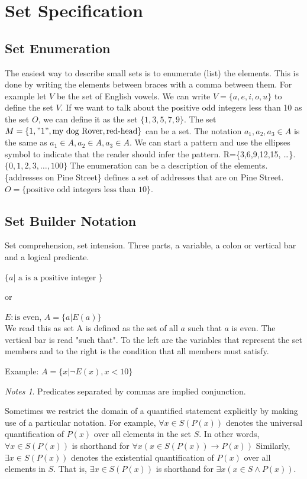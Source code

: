 \documentclass[11pt]{book} %
\theoremstyle {definition}
\theoremstyle {remark}
\newtheorem*{notes}{Notes}
\begin{document}
  \section{Set Specification}
    \subsection {Set Enumeration}
  The easiest way to describe small sets is to enumerate (list) the elements. This is done by writing the elements between braces with a comma between them. For example let $V$ be the set of English vowels. We can write $V=\{a,e,i,o,u\}$ to define the set $V$. If we want to talk about the positive odd integers less than 10 as the set $O$, we can define it as the set $\{1,3,5,7,9\}$. 
The set $M=\{1, "1", \text{my dog Rover}, \text{red-head}\}$ can be a set. The notation $a_1,a_2,a_3 \in A$ is the same as $a_1 \in A, a_2 \in A, a_3 \in A$. We can start a pattern and use the ellipses symbol to indicate that the reader should infer the pattern. R=\{3,6,9,12,15, \dots\}. $\{0,1,2,3, \dots ,100\}$ The enumeration can be a description of the elements. \{addresses on Pine Street\} defines a set of addresses that are on Pine Street. $O=\{ \text{positive odd integers less than 10} \}$. 


     \subsection {Set Builder Notation}
Set comprehension, set intension. Three parts, a variable, a colon or vertical bar and a logical predicate.  


$\{a | \text{  a is a positive integer }\} $

or 

$E: \text{is even}$, 
$A= \{a | E(a)\}$\\
We read this as 
set A is defined as the set of all $a$ such that $a$ is even. The vertical bar is read "such that". To the left are the variables that represent the set members and to the right is the condition that all members must satisfy.

Example: $A = \{x | \lnot E(x),x<10\}  $

\begin{notes}
Predicates separated by commas are implied conjunction.
\end{notes}
  
Sometimes we restrict the domain of a quantified statement explicitly by making use of a particular notation. For example, $\forall x \in S (P(x))$       %
denotes the universal quantification of $P(x)$ over all elements in the set $S$. In other words, $\forall x \in S (P(x))$  is shorthand for $\forall x (x \in S(P(x)) \rightarrow P(x))$    
Similarly, $\exists x \in S(P(x))$ denotes the existential quantification of $P(x)$ over all elements in $S$. That is, $\exists x \in S(P(x))$ is shorthand for $\exists x (x \in S \land P(x))$.
\end{document}
